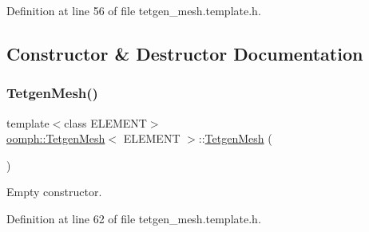 Definition at line 56 of file tetgen\+\_\+mesh.\+template.\+h.



\subsection{Constructor \& Destructor Documentation}
\mbox{\label{classoomph_1_1TetgenMesh_a2d2c7796e578f9fed1faf17569893531}} 
\subsubsection{\texorpdfstring{Tetgen\+Mesh()}{TetgenMesh()}\hspace{0.1cm}{\footnotesize\ttfamily [1/6]}}
{\footnotesize\ttfamily template$<$class E\+L\+E\+M\+E\+NT$>$ \\
\hyperlink{classoomph_1_1TetgenMesh}{oomph\+::\+Tetgen\+Mesh}$<$ E\+L\+E\+M\+E\+NT $>$\+::\hyperlink{classoomph_1_1TetgenMesh}{Tetgen\+Mesh} (\begin{DoxyParamCaption}{ }\end{DoxyParamCaption})\hspace{0.3cm}{\ttfamily [inline]}}



Empty constructor. 



Definition at line 62 of file tetgen\+\_\+mesh.\+template.\+h.

\mbox{\label{classoomph_1_1TetgenMesh_a10976b817c361f04da4ce996bd019c02}} 

